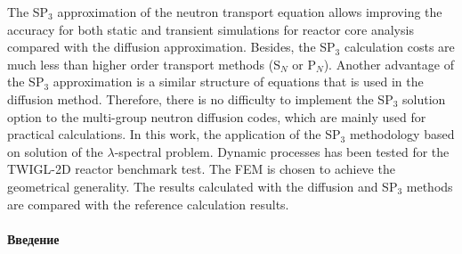\documentclass{crm-article}
\begin{document}

\begin{abstracteng}
The SP$_3$ approximation of the neutron transport equation allows improving the accuracy for both static and transient simulations for reactor core analysis compared with the diffusion approximation. 
Besides, the SP$_3$ calculation costs are much less than higher order transport methods (S$_N$ or P$_N$). 
Another advantage of the SP$_3$ approximation is a similar structure of equations that is used in the diffusion method. 
Therefore, there is no difficulty to implement the SP$_3$ solution option to the multi-group neutron diffusion codes, which are mainly used for practical calculations. 
In this work, the application of the SP$_3$ methodology based on solution of the $\lambda$-spectral problem. 
Dynamic processes has been tested for the TWIGL-2D reactor benchmark test. 
The FEM is chosen to achieve the geometrical generality. 
The results calculated with the diffusion and SP$_3$ methods are compared with the reference calculation results. 
\end{abstracteng}


\maketitle

\paragraph{Введение}
\end{document}
